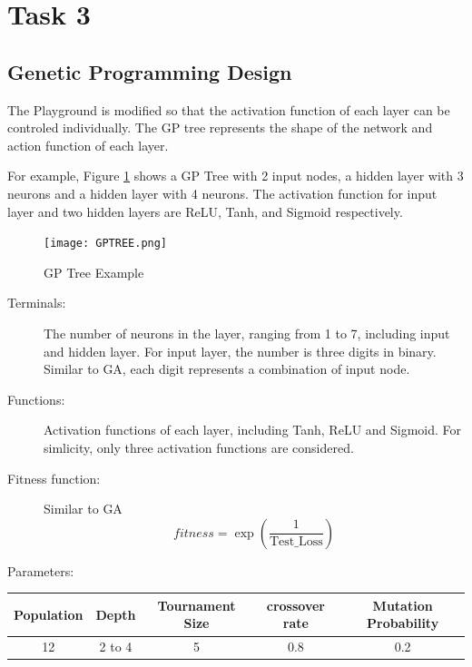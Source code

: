 \documentclass[12pt]{article}
\begin{document}
\section{Task 3}
\subsection{Genetic Programming Design}
The Playground is modified so that the activation function of each layer can be controled individually.
The GP tree represents the shape of the network and action function of each layer.

For example, Figure \ref{gptree} shows a GP Tree with 2 input nodes, a hidden layer with 3 neurons and a hidden layer with 4 neurons. The activation function for input layer and two hidden layers are ReLU, Tanh, and Sigmoid respectively.
\begin{figure}
\centering
    \texttt{[image: GPTREE.png]}
    \caption{GP Tree Example}
    \label{gptree}
\end{figure}
\begin{description}
\item[Terminals: ]
The number of neurons in the layer, ranging from 1 to 7, including input and hidden layer. For input layer, the number is three digits in binary. Similar to GA, each digit represents a combination of input node.
\end{description}
\begin{description}
\item[Functions: ]
Activation functions of each layer, including Tanh, ReLU and Sigmoid. For simlicity, only three activation functions are considered.
\end{description}

\begin{description}
\item[Fitness function: ]
Similar to GA
\[
fitness = \exp(\frac1{\text{Test\_Loss}})
\]

\end{description}

\begin{description}
\item[Parameters: ]
\end{description}
\begin{center}
\begin{tabular}{ccccc}
\toprule
Population & Depth & Tournament Size & crossover rate & Mutation Probability \\ \midrule
12 & 2 to 4 & 5 & 0.8 & 0.2  \\
\bottomrule
\end{tabular}
\end{center}
\end{document}
